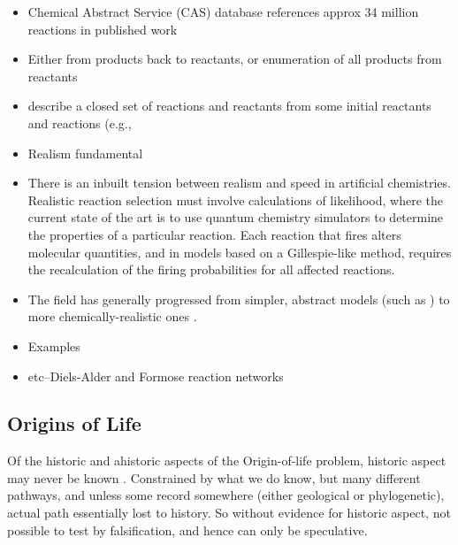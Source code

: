 \begin{itemize}
	\item
 Chemical Abstract Service (CAS) database references approx 34 million
 reactions in published work
	\item
 Either from products back to reactants, or enumeration of all products
 from reactants
	\item
 describe a closed set of reactions and reactants from some initial
 reactants and reactions (e.g., \autocite{Faulon2001}
	\item
 Realism fundamental
	\item
 There is an inbuilt tension between realism and speed in artificial
 chemistries. Realistic reaction selection must involve calculations of
 likelihood, where the current state of the art is to use quantum
 chemistry simulators to determine the properties of a particular
 reaction. Each reaction that fires alters molecular quantities, and in
 models based on a Gillespie-like method, requires the recalculation of
 the firing probabilities for all affected reactions.
	\item
 The field has generally progressed from simpler, abstract models (such
 as \autocite{Fontana1992}) to more chemically-realistic ones
 \autocite{Suzuki2008a}.
	\item
 Examples
	\item
 \autocite{Hogerl2010} etc--Diels-Alder and Formose reaction networks
\end{itemize}

\subsection{Origins of Life}\label{origins-of-life}

Of the historic and ahistoric aspects of the Origin-of-life problem,
historic aspect may never be known \autocite{Pross2013}. Constrained by
what we do know, but many different pathways, and unless some record
somewhere (either geological or phylogenetic), actual path essentially
lost to history. So without evidence for historic aspect, not possible
to test by falsification, and hence can only be speculative.

